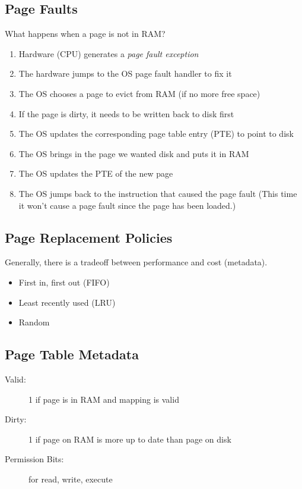 \subsection{Page Faults}
What happens when a page is not in RAM?
\begin{enumerate}
    \item Hardware (CPU) generates a \emph{page fault exception}
    \item The hardware jumps to the OS page fault handler to fix it
    \item The OS chooses a page to evict from RAM (if no more free space)
    \item If the page is dirty, it needs to be written back to disk first
    \item The OS updates the corresponding page table entry (PTE) to point to disk
    \item The OS brings in the page we wanted disk and puts it in RAM
    \item The OS updates the PTE of the new page
    \item The OS jumps back to the instruction that caused the page fault (This
time it won’t cause a page fault since the page has been loaded.)
\end{enumerate}

\subsection{Page Replacement Policies}
Generally, there is a tradeoff between performance and cost (metadata).
\begin{itemize}
    \item First in, first out (FIFO)
    \item Least recently used (LRU)
    \item Random
\end{itemize}

\subsection{Page Table Metadata}
\begin{description}
    \item[Valid:] 1 if page is in RAM and mapping is valid
    \item[Dirty:] 1 if page on RAM is more up to date than page on disk
    \item[Permission Bits:] for read, write, execute
\end{description}